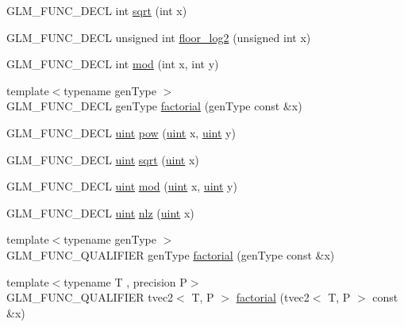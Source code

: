 \begin{DoxyCompactItemize}
\item 
G\+L\+M\+\_\+\+F\+U\+N\+C\+\_\+\+D\+E\+C\+L int \hyperlink{group__gtx__integer_ga78e2e68330e91d350fcfc2f4831cad12}{sqrt} (int x)
\item 
G\+L\+M\+\_\+\+F\+U\+N\+C\+\_\+\+D\+E\+C\+L unsigned int \hyperlink{group__gtx__integer_ga7011b4e1c1e1ed492149b028feacc00e}{floor\+\_\+log2} (unsigned int x)
\item 
G\+L\+M\+\_\+\+F\+U\+N\+C\+\_\+\+D\+E\+C\+L int \hyperlink{group__gtx__integer_gab9d22df91aac4d9eb925a4910f556f1b}{mod} (int x, int y)
\item 
{\footnotesize template$<$typename gen\+Type $>$ }\\G\+L\+M\+\_\+\+F\+U\+N\+C\+\_\+\+D\+E\+C\+L gen\+Type \hyperlink{group__gtx__integer_ga8cbd3120905f398ec321b5d1836e08fb}{factorial} (gen\+Type const \&x)
\item 
G\+L\+M\+\_\+\+F\+U\+N\+C\+\_\+\+D\+E\+C\+L \hyperlink{stb__image_8c_a91ad9478d81a7aaf2593e8d9c3d06a14}{uint} \hyperlink{group__gtx__integer_gaa8229e850c3cc4ad83492fe390ada044}{pow} (\hyperlink{stb__image_8c_a91ad9478d81a7aaf2593e8d9c3d06a14}{uint} x, \hyperlink{stb__image_8c_a91ad9478d81a7aaf2593e8d9c3d06a14}{uint} y)
\item 
G\+L\+M\+\_\+\+F\+U\+N\+C\+\_\+\+D\+E\+C\+L \hyperlink{stb__image_8c_a91ad9478d81a7aaf2593e8d9c3d06a14}{uint} \hyperlink{group__gtx__integer_ga457e9efca8339bf918d319e9c55f7c8f}{sqrt} (\hyperlink{stb__image_8c_a91ad9478d81a7aaf2593e8d9c3d06a14}{uint} x)
\item 
G\+L\+M\+\_\+\+F\+U\+N\+C\+\_\+\+D\+E\+C\+L \hyperlink{stb__image_8c_a91ad9478d81a7aaf2593e8d9c3d06a14}{uint} \hyperlink{group__gtx__integer_gab8f9ec0ca93ca90669434224818f0750}{mod} (\hyperlink{stb__image_8c_a91ad9478d81a7aaf2593e8d9c3d06a14}{uint} x, \hyperlink{stb__image_8c_a91ad9478d81a7aaf2593e8d9c3d06a14}{uint} y)
\item 
G\+L\+M\+\_\+\+F\+U\+N\+C\+\_\+\+D\+E\+C\+L \hyperlink{stb__image_8c_a91ad9478d81a7aaf2593e8d9c3d06a14}{uint} \hyperlink{group__gtx__integer_gacbe62fd2384464c16ea30ecc4defc11c}{nlz} (\hyperlink{stb__image_8c_a91ad9478d81a7aaf2593e8d9c3d06a14}{uint} x)
\item 
{\footnotesize template$<$typename gen\+Type $>$ }\\G\+L\+M\+\_\+\+F\+U\+N\+C\+\_\+\+Q\+U\+A\+L\+I\+F\+I\+E\+R gen\+Type \hyperlink{group__gtx__integer_ga8cbd3120905f398ec321b5d1836e08fb}{factorial} (gen\+Type const \&x)
\item 
{\footnotesize template$<$typename T , precision P$>$ }\\G\+L\+M\+\_\+\+F\+U\+N\+C\+\_\+\+Q\+U\+A\+L\+I\+F\+I\+E\+R tvec2$<$ T, P $>$ \hyperlink{namespaceglm_a2413666012b76baf1d3f0c44002f1154}{factorial} (tvec2$<$ T, P $>$ const \&x)

\end{DoxyCompactItemize}
